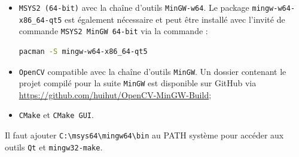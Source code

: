 \documentclass[12pt]{report}
\begin{document}
\begin{itemize}
    \vspace{2mm}
    \item \texttt{MSYS2 (64-bit)} avec la chaîne d'outils \texttt{MinGW-w64}. Le package \texttt{mingw-w64-x86\_64-qt5} est également nécessaire et peut être installé avec l'invité de commande \texttt{MSYS2 MinGW 64-bit} via la commande :
    \begin{lstlisting}[language=bash]
    pacman -S mingw-w64-x86_64-qt5
    \end{lstlisting}
    \vspace{2mm}
    \item \texttt{OpenCV} compatible avec la chaîne d'outils \texttt{MinGW}. Un dossier contenant le projet compilé pour la suite \texttt{MinGW} est disponible sur GitHub via \url{https://github.com/huihut/OpenCV-MinGW-Build};
    \vspace{2mm}
    \item \texttt{CMake} et \texttt{CMake GUI}.
    \vspace{2mm}
\end{itemize}

Il faut ajouter \texttt{C:\textbackslash msys64\textbackslash mingw64\textbackslash bin} au PATH système pour accéder aux outils \texttt{Qt} et \texttt{mingw32-make}.
\end{document}
